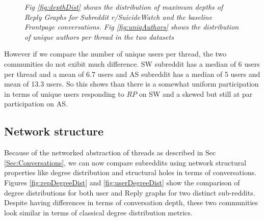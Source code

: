 \begin{figure}[!ht]
	\centering
\caption{\textsl{ Fig \ref{fig:depthDist} shows the distribution of maximum depths of Reply Graphs for Subreddit r/SuicideWatch and the baseline Frontpage conversations. Fig \ref{fig:uniqAuthors} shows the distribution of unique authors per thread in the two datasets}}
\end{figure}



However if we  compare the number of unique users per thread, the two communities do not exibit much difference. SW subreddit has a median of 6 users per thread and a mean of 6.7 users and AS subreddit has a median of 5 users and mean of 13.3 users. So this shows than there is a somewhat uniform participation in terms of unique users responding to $RP$ on SW and a skewed but still at par participation on AS. 

\subsection{Network structure}
Because of the networked abstraction of threads as described in Sec \ref{Sec:Conversations}, we can now compare subreddits using network structural properties like degree distribution and structural holes in terms of conversations. 
Figures \ref{fig:repDegreeDist} and \ref{fig:userDegreeDist} show the comparison of degree distributions for both user and Reply graphs for two distinct sub-reddits. Despite having differences in terms of conversation depth, these two communities look similar in terms of classical degree distribution metrics. 

